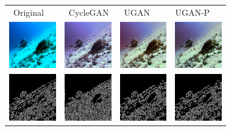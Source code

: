 \documentclass[letterpaper, 10pt, conference]{ieeeconf}
\begin{document}
\begin{figure}
\centering
\begin{tabular}{p{1.7cm} p{1.7cm} p{1.7cm} p{1.7cm}}
  
   ~\quad Original & ~CycleGAN & ~\quad UGAN & \quad UGAN-P \\

   \includegraphics[width=0.8in]{1_original} &
   \includegraphics[width=0.8in]{1_cimg} &
   \includegraphics[width=0.8in]{1_u0img} &
   \includegraphics[width=0.8in]{1_u1img} \\ [-1ex]
   \includegraphics[width=0.8in]{1_oedges} &
   \includegraphics[width=0.8in]{1_cedges} &
   \includegraphics[width=0.8in]{1_u0edges} &
   \includegraphics[width=0.8in]{1_u1edges} \\


\end{tabular}
\end{figure}
\end{document}

